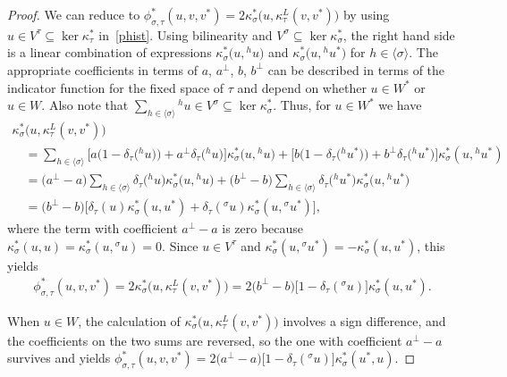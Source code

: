 \documentclass[10pt,a4paper]{amsart}
\numberwithin{equation}{section}
\newcommand{\actby}[1]{{}^{#1}}
\newcommand{\actbylessspace}[1]{{}^{#1}\!}
\begin{document}
\begin{proof}
We can reduce to
$\phi^*_{\sigma,\tau}(u,v,v^*)=2\kappa^*_{\sigma}\big(u,\kappa^L_{\tau}(v,v^*)\big)$
by using $u \in V^{\tau} \subseteq \ker\kappa^*_{\tau}$ in~\eqref{phist}.
Using bilinearity and $V^{\sigma} \subseteq \ker \kappa^*_{\sigma}$, the right hand
side is a linear combination of expressions $\kappa^*_{\sigma}\big(u,\actby{h}u\big)$ and
$\kappa^*_{\sigma}\big(u,\actby{h}u^*\big)$ for $h \in \langle \sigma \rangle$.
The appropriate coefficients in terms of $a$, $a^\perp$, $b$, $b^\perp$ can be described
in terms of the indicator function for the fixed space of $\tau$ and depend on
whether $u \in W^*$ or~$u \in W$.
Also note that $\sum_{h \in \langle \sigma \rangle} \actby{h}u \in V^{\sigma} \subseteq \ker \kappa^*_{\sigma}$.
Thus, for $u \in W^*$ we have
\begin{gather*}
\kappa^*_{\sigma}\big(u,\kappa^L_{\tau}(v,v^*)\big)
\\ \quad
{}=\sum\limits_{h \in \langle \sigma \rangle} \!\! \big[a\big(1-\delta_{\tau}\big(\actby{h}u\big)\big)+a^\perp\delta_{\tau}\big(\actby{h}u\big)\big]\kappa^*_{\sigma}\big(u,\actby{h}u\big) +\big[b\big(1-\delta_{\tau}\big(\actby{h}u^*\big)\big)+b^\perp\delta_{\tau}\big(\actby{h}u^*\big)\big] \kappa^*_{\sigma}(u,\actby{h}u^*)
\\ \quad
{}=\big(a^\perp-a\big)\sum\limits_{h \in \langle \sigma \rangle}
\delta_{\tau}\big(\actby{h}u\big)\kappa^*_{\sigma}\big(u,\actby{h}u\big)
+\big(b^\perp-b\big)\sum\limits_{h \in \langle \sigma \rangle}
\delta_{\tau}\big(\actby{h}u^*\big)\kappa^*_{\sigma}\big(u,\actby{h}u^*\big)
\\ \quad
{}=\big(b^\perp-b\big)\big[\delta_{\tau}(u)\kappa^*_{\sigma}(u,u^*)
+\delta_{\tau}(\actbylessspace{\sigma}u)\kappa^*_{\sigma}(u,\actbylessspace{\sigma}u^*)\big],
\end{gather*}
where the term with coefficient $a^\perp-a$ is zero because $\kappa^*_{\sigma}(u,u)=\kappa^*_{\sigma}(u,\actbylessspace{\sigma}u)=0$.
Since $u \in V^{\tau}$ and $\kappa^*_{\sigma}(u,\actbylessspace{\sigma}u^*)=-\kappa^*_{\sigma}(u,u^*)$, this yields
\begin{gather*} \phi^*_{\sigma,\tau}(u,v,v^*)=2\kappa^*_{\sigma}\big(u,\kappa^L_{\tau}(v,v^*)\big)=2\big(b^\perp-b\big) \big[1-\delta_{\tau}(\actbylessspace{\sigma}u)\big]\kappa^*_{\sigma}(u,u^*).
\end{gather*}
	
When $u \in W$, the calculation of $\kappa^*_{\sigma}\big(u,\kappa^L_{\tau}(v,v^*)\big)$
involves a sign difference, and the coefficients on the two sums
are reversed, so the one with coefficient $a^\perp-a$ survives and yields
$\phi^*_{\sigma,\tau}(u,v,v^*)=2\big(a^\perp-a\big)\big[1-\delta_{\tau}(\actbylessspace{\sigma}u)\big]\kappa^*_{\sigma}(u^*,u)$.


\end{proof}
\end{document}
